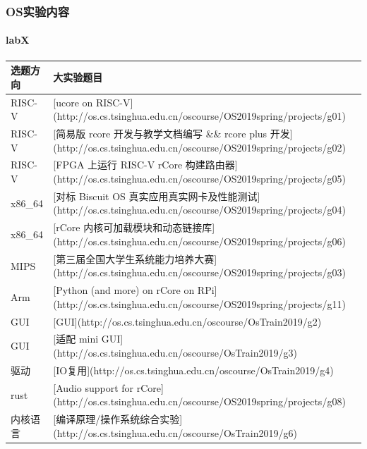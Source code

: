 \documentclass[UTF8]{ctexbeamer}
\begin{document}
\begin{frame}
\frametitle{OS实验内容}
\framesubtitle{labX}

\begin{table}[]
\begin{tabular}{|l|l|}
\hline
选题方向    & 大实验题目                                                                                                              \\ \hline
RISC-V  & {[}ucore on RISC-V{]}(http://os.cs.tsinghua.edu.cn/oscourse/OS2019spring/projects/g01)                             \\ \hline
RISC-V  & {[}简易版 rcore 开发与教学文档编写 \&\& rcore plus 开发{]}(http://os.cs.tsinghua.edu.cn/oscourse/OS2019spring/projects/g02)      \\ \hline
RISC-V  & {[}FPGA 上运行 RISC-V   rCore 构建路由器{]}(http://os.cs.tsinghua.edu.cn/oscourse/OS2019spring/projects/g05)               \\ \hline
x86\_64 & {[}对标 Biscuit OS 真实应用真实网卡及性能测试{]}(http://os.cs.tsinghua.edu.cn/oscourse/OS2019spring/projects/g04)                 \\ \hline
x86\_64 & {[}rCore 内核可加载模块和动态链接库{]}(http://os.cs.tsinghua.edu.cn/oscourse/OS2019spring/projects/g06)                         \\ \hline
MIPS    & {[}第三届全国大学生系统能力培养大赛{]}(http://os.cs.tsinghua.edu.cn/oscourse/OS2019spring/projects/g03)                            \\ \hline
Arm     & {[}Python (and more) on rCore on RPi{]}(http://os.cs.tsinghua.edu.cn/oscourse/OS2019spring/projects/g11)           \\ \hline
GUI     & {[}GUI{]}(http://os.cs.tsinghua.edu.cn/oscourse/OsTrain2019/g2)                                                    \\ \hline
GUI     & {[}适配 mini GUI{]}(http://os.cs.tsinghua.edu.cn/oscourse/OsTrain2019/g3)                                            \\ \hline
驱动      & {[}IO复用{]}(http://os.cs.tsinghua.edu.cn/oscourse/OsTrain2019/g4)                                                   \\ \hline
rust    & {[}Audio support for rCore{]}(http://os.cs.tsinghua.edu.cn/oscourse/OS2019spring/projects/g08)                     \\ \hline
内核语言    & {[}编译原理/操作系统综合实验{]}(http://os.cs.tsinghua.edu.cn/oscourse/OsTrain2019/g6)                                          \\ \hline

\end{tabular}
\end{table}
\end{frame}
\end{document}
